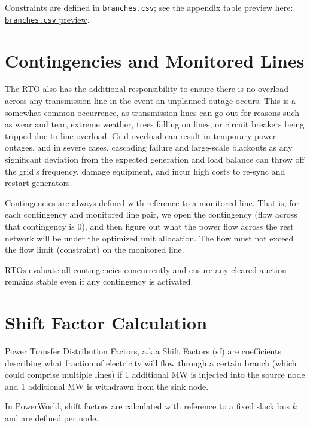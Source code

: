 \documentclass[11pt]{article}
\begin{document}
Constraints are defined in \texttt{branches.csv}; see the appendix table preview here: \hyperref[app:branches-preview]{\texttt{branches.csv} preview}.

\section{Contingencies and Monitored Lines}
The RTO also has the additional responsibility to ensure there is no overload across any transmission line in the event an unplanned outage occurs. This is a somewhat common occurrence, as transmission lines can go out for reasons such as wear and tear, extreme weather, trees falling on lines, or circuit breakers being tripped due to line overload. Grid overload can result in temporary power outages, and in severe cases, cascading failure and large-scale blackouts as any significant deviation from the expected generation and load balance can throw off the grid's frequency, damage equipment, and incur high costs to re-sync and restart generators.

Contingencies are always defined with reference to a monitored line. That is, for each contingency and monitored line pair, we open the contingency (flow across that contingency is 0), and then figure out what the power flow across the rest network will be under the optimized unit allocation. The flow must not exceed the flow limit (constraint) on the monitored line.




RTOs evaluate all contingencies concurrently and ensure any cleared auction remains stable even if any contingency is activated.

\section{Shift Factor Calculation}
Power Transfer Distribution Factors, a.k.a Shift Factors (sf) are coefficients describing what fraction of electricity will flow through a certain branch (which could comprise multiple lines) if 1 additional MW is injected into the source node and 1 additional MW is withdrawn from the sink node.

In PowerWorld, shift factors are calculated with reference to a fixed slack bus $k$ and are defined per node. 
\end{document}
